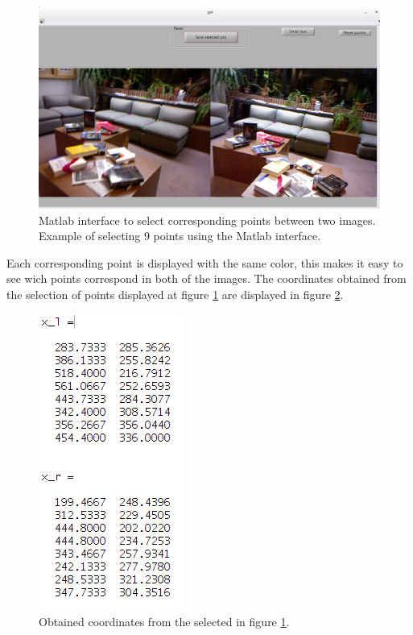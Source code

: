 \documentclass[a4paper,12pt]{article}
\begin{document}
    \begin{figure}[h]
        \centering
        \includegraphics[totalheight=.38\textheight]{./images/Example.jpg}
        \caption{Matlab interface to select corresponding points between two images.
        Example of selecting 9 points using the Matlab interface.}
        \label{fig:demo}
    \end{figure}

    Each corresponding point is displayed with the same color, 
    this makes it easy to see wich points correspond in both of the images.
    The coordinates obtained from the selection of points displayed at figure \ref{fig:demo} 
    are displayed in figure \ref{fig:pts}.

    \begin{figure}[h]
        \centering
        \includegraphics[totalheight=.24\textheight]{./images/ExamplePts.png}
        \caption{Obtained coordinates from the selected in figure \ref{fig:demo}.}
        \label{fig:pts}
    \end{figure}
\end{document}
